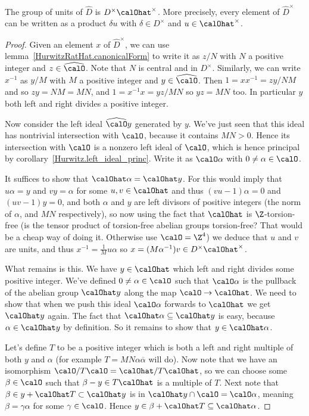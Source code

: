 \begin{theorem}
    \label{HurwitzRatHat.completed_units}
    \leanok
    The group of units of $\widehat{D}$ is $D^\times\calOhat^\times$.
    More precisely, every element of $\widehat{D}^\times$ can be written as a product $\delta u$
    with $\delta\in D^\times$ and $u\in\calOhat^\times$.
\end{theorem}
\begin{proof}
    Given an element $x$ of $\widehat{D}^\times$, we can use lemma~\ref{HurwitzRatHat.canonicalForm}
    to write it as $z/N$ with $N$ a positive integer
    and $z\in\widehat{\calO}$. Note that $N$ is central and in $D^\times$. Similarly, we can
    write $x^{-1}$ as $y/M$ with $M$ a positive integer and $y\in\widehat{\calO}$. Then
    $1=xx^{-1}=zy/NM$ and so $zy=NM=MN$, and $1=x^{-1}x=yz/MN$ so $yz=MN$ too. In particular $y$
    both left and right divides a positive integer.

    Now consider the left ideal $\widehat{\calO}y$ generated by $y$. We've just seen that
    this ideal has nontrivial intersection with $\calO$, because it contains $MN>0$. Hence
    its intersection with $\calO$ is a nonzero left ideal of $\calO$, which is
    hence principal by corollary~\ref{Hurwitz.left_ideal_princ}. Write it as $\calO\alpha$
    with $0\not=\alpha\in\calO$.

    It suffices to show that $\calOhat\alpha=\calOhat y$. For this would imply that
    $u\alpha=y$ and $vy=\alpha$ for some $u,v\in\calOhat$ and thus $(vu-1)\alpha=0$
    and $(uv-1)y=0$, and both $\alpha$ and $y$ are left divisors of positive integers
    (the norm of $\alpha$, and $MN$ respectively), so now using the fact that $\calOhat$
    is $\Z$-torsion-free (is the tensor product of torsion-free abelian groups torsion-free? That
    would be a cheap way of doing it. Otherwise use $\calO=\Z^4$) we deduce that $u$ and $v$
    are units, and thus $x^{-1}=\frac{1}{M}u\alpha$ so $x=(M\alpha^{-1})v\in D^\times\calOhat^\times$.

    What remains is this. We have $y\in\calOhat$ which left and right divides some positive integer.
    We've defined $0\not=\alpha\in\calO$ such that $\calO\alpha$ is the pullback of the
    abelian group $\calOhat y$ along the map $\calO\to\calOhat$. We need to show that when we push
    this ideal $\calO\alpha$ forwards to $\calOhat$ we get $\calOhat y$ again. The fact that
    $\calOhat\alpha\subseteq\calOhat y$ is easy, because $\alpha\in\calOhat y$ by definition.
    So it remains to show that $y\in\calOhat\alpha$.

    Let's define $T$ to be a positive integer which is both a left and right multiple of
    both $y$ and $\alpha$ (for example $T=MN\alpha\overline{\alpha}$ will do). Now note that we
    have an isomorphism $\calO/T\calO=\calOhat/T\calOhat$, so we can choose
    some $\beta\in\calO$ such that $\beta-y\in T\calOhat$ is a multiple of $T$. Next note that
    $\beta\in y+\calOhat T\subset \calOhat y$ is in $\calOhat y\cap\calO=\calO\alpha$, meaning
    $\beta=\gamma\alpha$ for some $\gamma\in\calO$.
    Hence $y\in\beta+\calOhat T\subseteq\calOhat\alpha$.
\end{proof}


